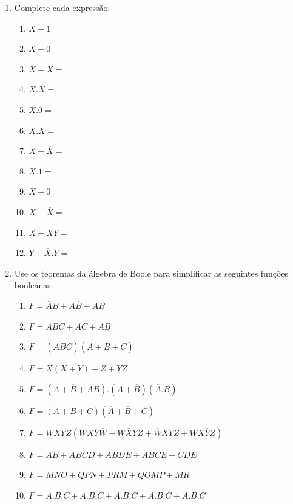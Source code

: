 \documentclass[12pt,onepage,a4paper]{memoir}
\begin{document}
\begin{enumerate}
    \item Complete cada expressão:
    \begin{multicols}{2}
    \begin{enumerate}
        \item $X + 1 =$ 
        \item $X + 0 =$
        \item $X + X =$
        \item $X.X =$ 
        \item $X.0 =$ 
        \item $X.\overline{X} =$
        \item $X + \overline{X} =$
        \item $X.1 =$ 
        \item $X + 0 =$
        \item $X + \overline{X} =$ 
        \item $X + XY =$ 
        \item $Y +\overline{X}.Y =$
    \end{enumerate}
    \end{multicols}

    \item Use os teoremas da álgebra de Boole para simplificar as seguintes funções booleanas.
    \begin{enumerate}
        \item $F = \overline{A}B+ A\overline{B} + AB$
        \item $F = ABC + A\overline{C} + A\overline{B}$
        \item $F = (AB\overline{C})(\overline{A} + \overline{B} + \overline{C})$
        \item $F = \overline{X}(X+Y)+\overline{Z}+YZ$
        \item $F = (A+\overline{B}+AB).(A+\overline{B})(\overline{A}.B)$
        \item $F = (A+B+C)(\overline{A}+\overline{B}+C)$
        \item $F = WXYZ(WXY\overline{W} + W\overline{X}YZ + \overline{W}XYZ + WX\overline{Y}Z)$
        \item $F = AB + AB\overline{C}D + ABD\overline{E} + AB\overline{C}E + \overline{C}DE$
        \item $F = MNO + \overline{Q}P\overline{N} + PRM + \overline{Q}OM\overline{P} + MR$
        \item $F = \overline{A}.\overline{B}.C+ \overline{A}.B.C+\overline{A}.B.\overline{C}+A.B.C + A.B.\overline{C}$
    \end{enumerate}


\end{enumerate}
\end{document}
